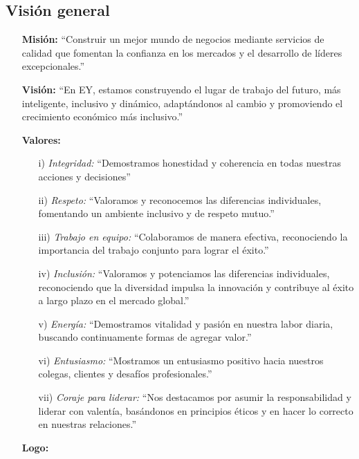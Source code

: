 \documentclass{article}[14pts]
\begin{document}
  \subsection{Visión general}  

    \begin{itemize}

      \item[\textbf{Misión:}] ``Construir un mejor mundo de negocios mediante servicios de calidad que fomentan la 
      confianza en los mercados y el desarrollo de líderes excepcionales.''

      \item[\textbf{Visión:}] ``En EY, estamos construyendo el lugar de trabajo del futuro, más inteligente, inclusivo y 
      dinámico, adaptándonos al cambio y promoviendo el crecimiento económico más inclusivo.''

      \item[\textbf{Valores:}] 

    \begin{enumerate}
        
        \item[i)] \emph{Integridad:} ``Demostramos honestidad y coherencia en todas nuestras acciones y decisiones'' 
        
        \item[ii)] \emph{Respeto:} ``Valoramos y reconocemos las diferencias individuales, fomentando un ambiente 
        inclusivo y de respeto mutuo.'' 

        \item[iii)] \emph{Trabajo en equipo:} ``Colaboramos de manera efectiva, reconociendo la importancia del trabajo conjunto para lograr el éxito.''

        \item[iv)] \emph{Inclusión:} ``Valoramos y potenciamos las diferencias individuales, reconociendo que la 
        diversidad impulsa la innovación y contribuye al éxito a largo plazo en el mercado global.''

        \item[v)] \emph{Energía:}  ``Demostramos vitalidad y pasión en nuestra labor diaria, buscando continuamente 
        formas de agregar valor.''

        \item[vi)] \emph{Entusiasmo:} ``Mostramos un entusiasmo positivo hacia nuestros colegas, clientes y desafíos profesionales.''

        \item[vii)] \emph{Coraje para liderar:}  ``Nos destacamos por asumir la responsabilidad y liderar con valentía, basándonos en principios éticos y en hacer lo correcto en nuestras relaciones.''
      
    \end{enumerate}

    \item[\textbf{Logo:}]
  \end{itemize} 
\end{document}
